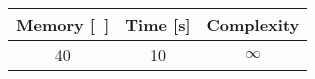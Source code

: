 \begin{tabular}{ccc}
	\toprule
	Memory [\si{\mebi\byte}] & Time [\si{\second}] & Complexity \\
	\midrule
	40 & 10 & \(\infty\) \\
	\bottomrule
\end{tabular}
